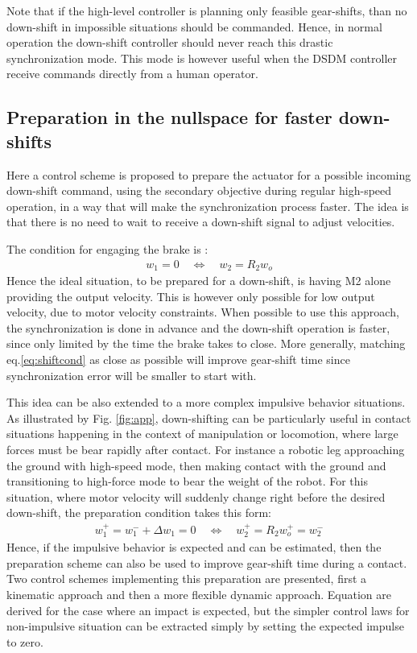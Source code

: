 %
Note that if the high-level controller is planning only feasible gear-shifts, than no down-shift in impossible situations should be commanded. Hence, in normal operation the down-shift controller should never reach this drastic synchronization mode. This mode is however useful when the DSDM controller receive commands directly from a human operator.

\subsection{Preparation in the nullspace for faster down-shifts}
\label{sec:prep}

Here a control scheme is proposed to prepare the actuator for a possible incoming down-shift command, using the secondary objective during regular high-speed operation, in a way that will make the synchronization process faster. The idea is that there is no need to wait to receive a down-shift signal to adjust velocities. 

The condition for engaging the brake is :
%
\begin{align}
w_1 = 0 \quad \Leftrightarrow \quad w_2 = R_2 w_o
\label{eq:shiftcond}
\end{align}
%
Hence the ideal situation, to be prepared for a down-shift, is having M2 alone providing the output velocity. This is however only possible for low output velocity, due to motor velocity constraints. When possible to use this approach, the synchronization is done in advance and the down-shift operation is faster, since only limited by the time the brake takes to close. More generally, matching eq.\eqref{eq:shiftcond} as close as possible will improve gear-shift time since synchronization error will be smaller to start with.

This idea can be also extended to a more complex impulsive behavior situations. As illustrated by Fig. \ref{fig:app}, down-shifting can be particularly useful in contact situations happening in the context of manipulation or locomotion, where large forces must be bear rapidly after contact. For instance a robotic leg approaching the ground with high-speed mode, then making contact with the ground and transitioning to high-force mode to bear the weight of the robot. For this situation, where motor velocity will suddenly change right before the desired down-shift, the preparation condition takes this form:
%
\begin{align}
w_1^+ = w_1^- + \Delta w_1 = 0 \quad \Leftrightarrow \quad w_2^+ = R_2 w_o^+ = w_2^- 
\end{align}
%
Hence, if the impulsive behavior is expected and can be estimated, then the preparation scheme can also be used to improve gear-shift time during a contact. Two control schemes implementing this preparation are presented, first a kinematic approach and then a more flexible dynamic approach. Equation are derived for the case where an impact is expected, but the simpler control laws for non-impulsive situation can be extracted simply by setting the expected impulse to zero.


